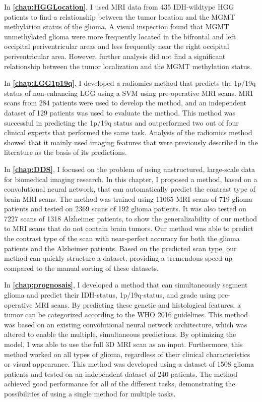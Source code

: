 In \textbf{\cref{chap:HGGLocation}}, I used \gls{MRI} data from 435 \gls{IDH}-wildtype \gls{HGG} patients to find a relationship between the \gls{tumor} location and the \gls{MGMT} methylation status of the glioma.
A visual inspection found that \gls{MGMT} unmethylated glioma were more frequently located in the bifrontal and left occipital periventricular areas and less frequently near the right occipital periventricular area.
However, further analysis did not find a significant relationship between the \gls{tumor} localization and the \gls{MGMT} methylation status.

In \textbf{\cref{chap:LGG1p19q}}, I developed a radiomics method that predicts the 1p/19q status of non-enhancing \gls{LGG} using a \gls{SVM} using pre-operative \gls{MRI} scans.
\gls{MRI} scans from 284 patients were used to develop the method, and an independent dataset of 129 patients was used to evaluate the method.
This method was successful in predicting the 1p/19q status and outperformed two out of four clinical experts that performed the same task.
Analysis of the radiomics method showed that it mainly used imaging features that were previously described in the literature as the basis of its predictions.

In \textbf{\cref{chap:DDS}}, I focused on the problem of using unstructured, large-scale data for biomedical imaging research.
In this chapter, I proposed a method, based on a convolutional neural network, that can automatically predict the contrast type of brain \gls{MRI} scans.
The method was trained using 11065 \gls{MRI} scans of 719 glioma patients and tested on 2369 scans of 192 glioma patients.
It was also tested on 7227 scans of 1318 Alzheimer patients, to show the generalizability of our method to \gls{MRI} scans that do not contain brain \glspl{tumor}.
Our method was able to predict the contrast type of the scan with near-perfect accuracy for both the glioma patients and the Alzheimer patients.
Based on the predicted scan type, our method can quickly structure a dataset, providing a tremendous speed-up compared to the manual sorting of these datasets.

In \textbf{\cref{chap:prognosais}}, I developed a method that can simultaneously segment glioma and predict their \gls{IDH}-status, 1p/19q-status, and grade using pre-operative \gls{MRI} scans.
By predicting these genetic and histological features, a \gls{tumor} can be categorized according to the \gls{WHO} 2016 guidelines.
This method was based on an existing convolutional neural network architecture, which was altered to enable the multiple, simultaneous predictions.
By optimizing the model, I was able to use the full 3D \gls{MRI} scan as an input.
Furthermore, this method worked on all types of glioma, regardless of their clinical characteristics or visual appearance.
This method was developed using a dataset of 1508 glioma patients and tested on an independent dataset of 240 patients.
The method achieved good performance for all of the different tasks, demonstrating the possibilities of using a single method for multiple tasks.

